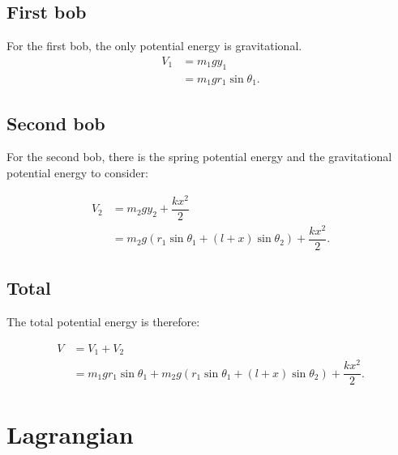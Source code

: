 \documentclass[12pt,a4paper,portrait]{article}
\begin{document}
	\subsection{First bob}
	For the first bob, the only potential energy is gravitational. 
	\begin{align*}
		V_1 &= m_1gy_1 \\
		&= m_1 gr_1\sin{\theta_1}.
	\end{align*}
	
	\subsection{Second bob}
	For the second bob, there is the spring potential energy and the gravitational potential energy to consider:
	
	\begin{align*}
		V_2 &= m_2gy_2 + \dfrac{kx^2}{2} \\
		&= m_2 g(r_1\sin{\theta_1} + (l+x)\sin{\theta_2}) + \dfrac{kx^2}{2}.
	\end{align*}
	
	\subsection{Total}
	The total potential energy is therefore:
	
	\begin{align*}
		V &= V_1 + V_2 \\
		&= m_1 gr_1\sin{\theta_1} + m_2 g(r_1\sin{\theta_1} + (l+x)\sin{\theta_2}) + \dfrac{kx^2}{2}.
	\end{align*}
	
	\section{Lagrangian}
\end{document}
